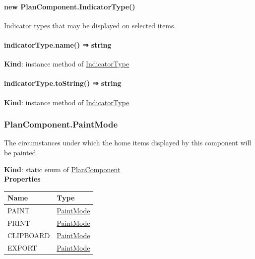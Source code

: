 \documentclass[a4paper]{report}
\begin{document}
\hypertarget{new-plancomponent.indicatortype}{%
\paragraph{new
PlanComponent.IndicatorType()}\label{new-plancomponent.indicatortype}}

Indicator types that may be displayed on selected items.

\hypertarget{indicatortype.name-string}{%
\paragraph{indicatorType.name() ⇒
string}\label{indicatortype.name-string}}

\textbf{Kind}: instance method of
\protect\hyperlink{PlanComponent.IndicatorType}{IndicatorType}\\

\hypertarget{indicatortype.tostring-string}{%
\paragraph{indicatorType.toString() ⇒
string}\label{indicatortype.tostring-string}}

\textbf{Kind}: instance method of
\protect\hyperlink{PlanComponent.IndicatorType}{IndicatorType}\\

\hypertarget{plancomponent.paintmode}{%
\subsubsection{PlanComponent.PaintMode}\label{plancomponent.paintmode}}

The circumstances under which the home items displayed by this component
will be painted.

\textbf{Kind}: static enum of
\protect\hyperlink{PlanComponent}{PlanComponent}\\
\textbf{Properties}

\begin{longtable}[]{@{}ll@{}}
\toprule
Name & Type\tabularnewline
\midrule
\endhead
PAINT &
\protect\hyperlink{PlanComponent.PaintMode}{PaintMode}\tabularnewline
PRINT &
\protect\hyperlink{PlanComponent.PaintMode}{PaintMode}\tabularnewline
CLIPBOARD &
\protect\hyperlink{PlanComponent.PaintMode}{PaintMode}\tabularnewline
EXPORT &
\protect\hyperlink{PlanComponent.PaintMode}{PaintMode}\tabularnewline
\bottomrule
\end{longtable}
\end{document}
